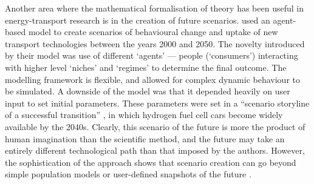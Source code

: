 
Another area where the mathematical formalisation of theory has been useful in
energy-transport research is in the creation of future scenarios.
\citet{Kohler2009} used an agent-based model to create scenarios of behavioural
change and uptake of new transport technologies between the years 2000 and
2050. The novelty introduced by their model was use of different `agents' ---
people (`consumers') interacting with higher level `niches' and `regimes' to
determine the final outcome. The modelling framework is flexible, and allowed
for complex dynamic behaviour to be simulated. A downside of the model was
that it depended heavily on user input to set initial parameters. These
parameters were set in a
``scenario storyline of a successful transition'' \citep[p.~2988]{Kohler2009},
in which hydrogen fuel
cell cars become widely available by the 2040s. Clearly, this scenario of the
future is more the product of human imagination than the scientific method,
and the future may take an entirely different technological path than that
imposed by the authors.
However, the sophistication of the approach shows that scenario creation
can go beyond simple population models \citep{Lovelace2011-assessing} or
user-defined snapshots of the future \citep{Akerman2006}.

